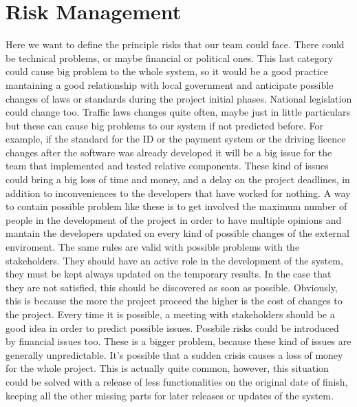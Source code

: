 \chapter{Risk Management}

Here we want to define the principle risks that our team could face.
\newline
There could be technical problems, or maybe financial or political ones.
This last category could cause big problem to the whole system, so it would be a good practice mantaining a good relationship with local government and anticipate possible changes of laws or standards during the project initial phases. 
National legislation could change too. Traffic laws changes quite often, maybe just in little particulars but these can cause big problems to our system if not predicted before.
For example, if the standard for the ID or the payment system or the driving licence changes after the software was already developed it will be a big issue for the team that implemented and tested relative components. These kind of issues could bring a big loss of time and money, and a delay on the project deadlines, in addition to inconveniences to the developers that have worked for nothing.
\newline
A way to contain possible problem like these is to get involved the maximum number of people in the development of the project in order to have multiple opinions and mantain the developers updated on every kind of possible changes of the external enviroment.
\newline
\newline
The same rules are valid with possible problems with the stakeholders.
They should have an active role in the development of the system, they must be kept always updated on the temporary results. In the case that they are not satisfied, this should be discovered as soon as possible.
Obviously, this is because the more the project proceed the higher is the cost of changes to the project.
Every time it is possible, a meeting with stakeholders should be a good idea in order to predict possible issues.
\newline
\newline
Possbile risks could be introduced by financial issues too.
These is a bigger problem, because these kind of issues are generally unpredictable.
It's possible that a sudden crisis causes a loss of money for the whole project. This is actually quite common, however, this situation could be solved with a release of less functionalities on the original date of finish, keeping all the other missing parts for later releases or updates of the system.

